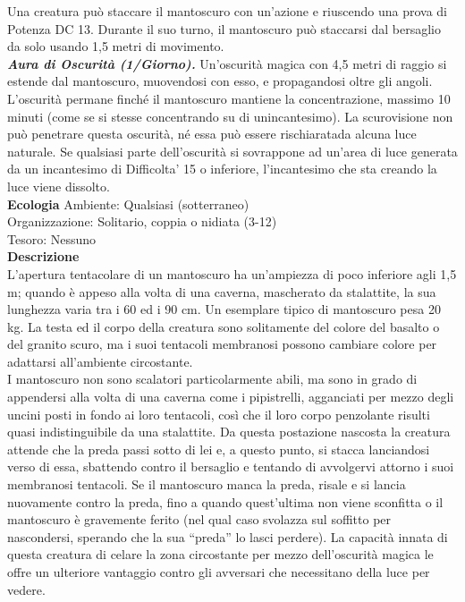 \begin{multicols}{2}
Una creatura può staccare il mantoscuro con un'azione e riuscendo una prova di Potenza DC 13. Durante il suo turno, il mantoscuro può staccarsi dal bersaglio da solo usando 1,5 metri di movimento.\\
\emph{\textbf{Aura di Oscurità (1/Giorno).}} Un'oscurità magica con 4,5 metri di raggio si estende dal mantoscuro, muovendosi con esso, e propagandosi oltre gli angoli. L'oscurità permane finché il mantoscuro mantiene la concentrazione, massimo 10 minuti (come se si stesse concentrando su di unincantesimo). La scurovisione non può penetrare  questa oscurità, né essa può essere rischiaratada alcuna luce naturale. Se qualsiasi parte dell'oscurità si sovrappone ad un'area di  luce generata da un incantesimo di Difficolta' 15 o inferiore, l'incantesimo che sta creando la luce viene dissolto.\\
\textbf{Ecologia}
Ambiente: Qualsiasi (sotterraneo)\\
Organizzazione: Solitario, coppia o nidiata (3-12)\\
Tesoro: Nessuno\\
\textbf{Descrizione}\\
L’apertura tentacolare di un mantoscuro ha un’ampiezza di poco inferiore agli 1,5 m; quando è appeso alla volta di una caverna, mascherato da stalattite, la sua lunghezza varia tra i 60 ed i 90 cm. Un esemplare tipico di mantoscuro pesa 20 kg. La testa ed il corpo della creatura sono solitamente del colore del basalto o del granito scuro, ma i suoi tentacoli membranosi possono cambiare colore per adattarsi all’ambiente circostante.\\

I mantoscuro non sono scalatori particolarmente abili, ma sono in grado di appendersi alla volta di una caverna come i pipistrelli, agganciati per mezzo degli uncini posti in fondo ai loro tentacoli, così che il loro corpo penzolante risulti quasi indistinguibile da una stalattite. Da questa postazione nascosta la creatura attende che la preda passi sotto di lei e, a questo punto, si stacca lanciandosi verso di essa, sbattendo contro il bersaglio e tentando di avvolgervi attorno i suoi membranosi tentacoli. Se il mantoscuro manca la preda, risale e si lancia nuovamente contro la preda, fino a quando quest’ultima non viene sconfitta o il mantoscuro è gravemente ferito (nel qual caso svolazza sul soffitto per nascondersi, sperando che la sua “preda” lo lasci perdere). La capacità innata di questa creatura di celare la zona circostante per mezzo dell’oscurità magica le offre un ulteriore vantaggio contro gli avversari che necessitano della luce per vedere.\\


\end{multicols}

